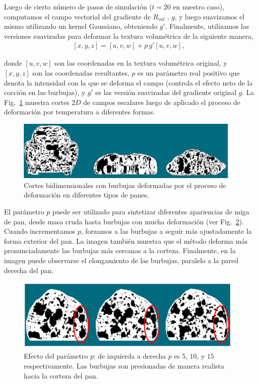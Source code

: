 Luego de cierto número de pasos de simulación ($t=20$ en nuestro caso), computamos el campo vectorial del gradiente de $R_{vol}$ \cite{Gonzalez2006}, $g$, y luego suavizamos el mismo utilizando un kernel Gaussiano, obteniendo $g'$.
Finalmente, utilizamos las versiones suavizadas para deformar la textura volumétrica de la siguiente manera,
\begin{align*}
\displaystyle
[x,y,z] = [u,v,w] + p\, g'[u,v,w],
\end{align*}

\noindent donde $[u,v,w]$ son las coordenadas en la textura volumétrica original, y $[x,y,z]$ son las coordenadas resultantes, $p$ es un parámetro real positivo que denota la intensidad con la que se deforma el campo (controla el efecto neto de la cocción en las burbujas), y $g'$ es las versión suavizadas del gradiente original $g$.
La Fig.~\ref{fg:bakedbubbles} muestra cortes $2D$ de campos escalares luego de aplicado el proceso de deformación por temperatura a diferentes formas.

\begin{figure}
\includegraphics[width=13cm]{figures/bakedbubbles}
\caption{Cortes bidimensionales con burbujas deformadas por el proceso de deformación en diferentes tipos de panes.}
\label{fg:bakedbubbles}
\end{figure}

El parámetro $p$ puede ser utilizado para sintetizar diferentes apariencias de miga de pan, desde masa cruda hasta burbujas con mucha deformación (ver Fig.~\ref{fg:parameterp}).
Cuando incrementamos $p$, forzamos a las burbujas a seguir más ajustadamente la forma exterior del pan. 
La imagen también muestra que el método deforma más pronunciadamente las burbujas más cercanas a la corteza.
Finalmente, en la imagen puede observarse el elongamiento de las burbujas, paralelo a la pared derecha del pan.

\begin{figure}
\includegraphics[width=13cm]{figures/parameterp}
\caption[Efecto del parámetro $p$ en la simulación de cocción]{Efecto del parámetro $p$: de izquierda a derecha $p$ es $5$, $10$, y $15$ respectivamente. Las burbujas son presionadas de manera realista hacia la corteza del pan.}
\label{fg:parameterp}
\end{figure}

